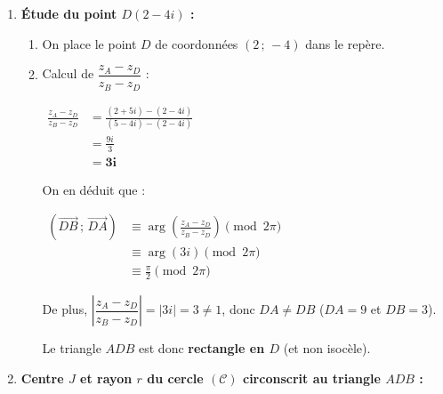 \documentclass[12pt,a4paper]{article}
\begin{document}
\begin{enumerate}
\begin{itemize}
        $
        \begin{aligned}
            BC &= |z_C - z_B|\\
            &= |(-1 - 4i) - (5 - 4i)|\\
            &= |-6|\\
            &= \mathbf{6\text{ cm}}
        \end{aligned}
        $
    \end{itemize}
    
    On constate que $AB = AC = 3\sqrt{10}$ (et $BC^2 = 36 \neq AB^2 + AC^2$). Le triangle $ABC$ est donc \textbf{isocèle en $A$}.

    \item \textbf{Étude du point $D(2 - 4i)$ :}
    
    \begin{enumerate}
        \item On place le point $D$ de coordonnées $(2\,;\,-4)$ dans le repère.
        
        \item Calcul de $\dfrac{z_A - z_D}{z_B - z_D}$ :
        
        $
        \begin{aligned}
            \frac{z_A - z_D}{z_B - z_D} &= \frac{(2 + 5i) - (2 - 4i)}{(5 - 4i) - (2 - 4i)}\\
            &= \frac{9i}{3}\\
            &= \mathbf{3i}
        \end{aligned}
        $
        
        On en déduit que :
        
        $
        \begin{aligned}
            \left(\overrightarrow{DB}\,;\,\overrightarrow{DA}\right) &\equiv \arg\left(\frac{z_A - z_D}{z_B - z_D}\right) \pmod{2\pi}\\
            &\equiv \arg(3i) \pmod{2\pi}\\
            &\equiv \frac{\pi}{2} \pmod{2\pi}
        \end{aligned}
        $
        
        De plus, $\left|\dfrac{z_A - z_D}{z_B - z_D}\right| = |3i| = 3 \neq 1$, donc $DA \neq DB$ ($DA = 9$ et $DB = 3$).
        
        Le triangle $ADB$ est donc \textbf{rectangle en $D$} (et non isocèle).
    \end{enumerate}

    \item \textbf{Centre $J$ et rayon $r$ du cercle $(\mathcal{C})$ circonscrit au triangle $ADB$ :}
    

\end{enumerate}
\end{document}
